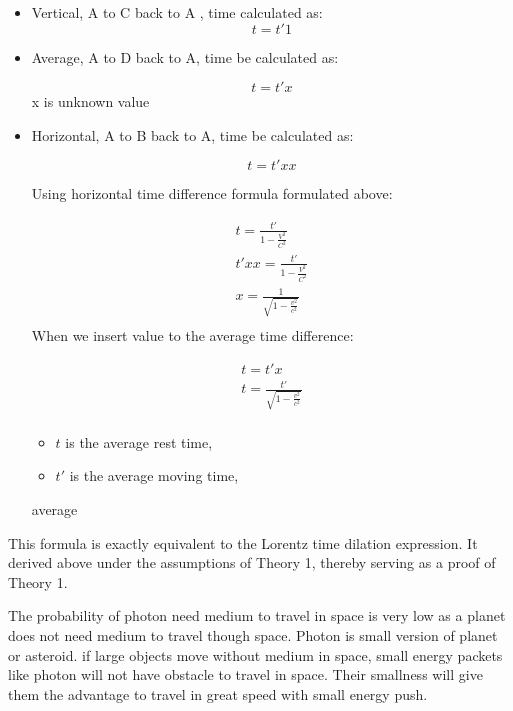 \documentclass{article}
\begin{document}
    \begin{itemize}
        \item Vertical, A to C back to A , time calculated as:
        \[
            t = {t'}{1}
        \]
        \item Average, A to D back to A, time be calculated as:

        \[
            t = {t'}{x}
        \]
        x is unknown value

        \item Horizontal, A to B back to A, time be calculated as:

        \[
            t = {t'}{x}{x}
        \]

        Using horizontal time difference formula formulated above:

        \begin{gather*}
            t = \frac{t'}{1 - \frac{V^2}{C^2}}\\
            {t'}{x}{x} = \frac{t'}{1 - \frac{V^2}{C^2}}\\
            {x} = \frac{1}{\sqrt{1 - \frac{v^2}{c^2}}}\\
        \end{gather*}
        When we insert  value to the average time difference:
        \begin{tcolorbox}
            \begin{gather*}
                t = {t'}{x}\\
                t = \frac{t'}{\sqrt{1 - \frac{v^2}{c^2}}}\\
            \end{gather*}

            \begin{itemize}
                \item \( t \) is the average rest time,
                \item \( t' \) is the average moving time,
            \end{itemize}average

        \end{tcolorbox}
    \end{itemize}

    This formula is exactly equivalent to the Lorentz time dilation expression.
    It derived above under the assumptions of Theory 1, thereby serving as a proof of Theory 1.

    The probability of photon need medium to travel in space is very low as a planet does not need medium to travel though space.
    Photon is small version of planet or asteroid.
    if large objects move without medium in space, small energy packets like photon will not have obstacle to travel in space.
    Their smallness will give them the advantage to travel in great speed with small energy push.
\end{document}
